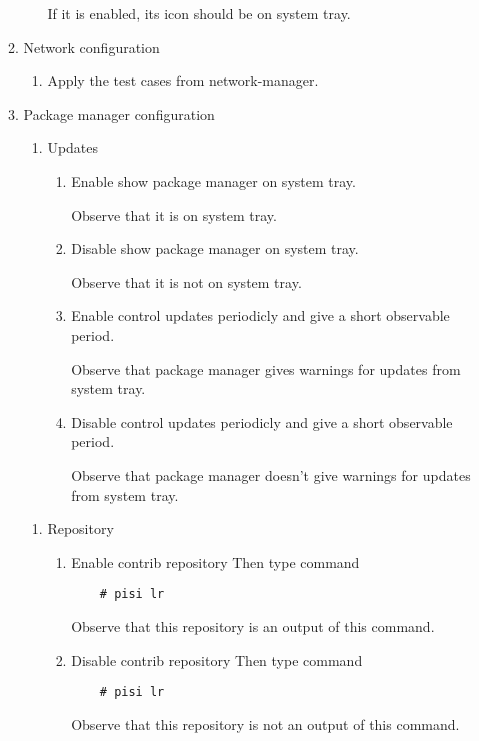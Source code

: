 \documentclass[a4paper,10pt]{article}
\begin{document}
\begin{enumerate}
\begin{enumerate}
\begin{enumerate}
        If it is enabled, its icon should be on system tray.
        \end{enumerate}

    \item Network configuration
        \begin{enumerate}
        \item Apply the test cases from network-manager.
        \end{enumerate}

    \item Package manager configuration
        \begin{enumerate}
        \item Updates
            \begin{enumerate}
            \item Enable show package manager on system tray.

                Observe that it is on system tray.
            \item Disable show package manager on system tray.

                Observe that it is not on system tray.
            \item Enable control updates periodicly and give a short observable period.

                Observe that package manager gives warnings for updates from system tray.
            \item Disable control updates periodicly and give a short observable period.

                Observe that package manager doesn't give warnings for updates from system tray.
            \end{enumerate}
        \end{enumerate}

        \begin{enumerate}
        \item Repository
            \begin{enumerate}
            \item Enable contrib repository 
                Then type command 
\begin{verbatim}
    # pisi lr 
\end{verbatim}
                 Observe that this repository is an output of this command.
            \item Disable contrib repository
                Then type command 
\begin{verbatim}
    # pisi lr 
\end{verbatim}
                 Observe that this repository is not an output of this command.
            \end{enumerate}
        \end{enumerate}


\end{enumerate}
\end{enumerate}
\end{document}
